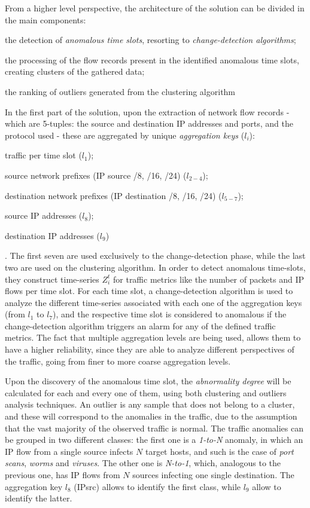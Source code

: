 \documentclass[runningheads,a4paper]{llncs}
\begin{document}
From a higher level perspective, the architecture of the solution can be divided in the main components:
\begin{enumerate*}
\item the detection of \emph{anomalous time slots}, resorting to \emph{change-detection algorithms};
\item the processing of the flow records present in the identified anomalous time slots, creating clusters of the gathered data;
\item the ranking of outliers generated from the clustering algorithm 
\end{enumerate*}


In the first part of the solution, upon the extraction of network flow records - which are 5-tuples: the source and destination IP addresses and ports, and the protocol used - these are aggregated by unique \textit{aggregation keys} ($ l_{i}$):
\begin{enumerate*}
\item traffic per time slot ($ l_{1} $);
\item source network prefixes (IP source /8, /16, /24) ($ l_{2-4} $);
\item destination network prefixes (IP destination /8, /16, /24) ($ l_{5-7} $);
\item source IP addresses ($ l_{8} $);
\item destination IP addresses ($ l_{9} $)
\end{enumerate*}. The first seven are used exclusively to the change-detection phase, while the last two are used on the clustering algorithm. In order to detect anomalous time-slots, they construct time-series $ Z_{i}^t $ for traffic metrics like the number of packets and IP flows per time slot. For each time slot, a change-detection algorithm is used to analyze the different time-series associated with each one of the aggregation keys (from $ l_{1} $ to $ l_{7} $), and the respective time slot is considered to anomalous if the change-detection algorithm triggers an alarm for any of the defined traffic metrics. The fact that multiple aggregation levels are being used, allows them to have a higher reliability, since they are able to analyze different perspectives of the traffic, going from finer to more coarse aggregation levels. 

Upon the discovery of the anomalous time slot, the \emph{abnormality degree}  will be calculated for each and every one of them, using both clustering and outliers analysis techniques. An outlier is any sample that does not belong to a cluster, and these will correspond to the anomalies in the traffic, due to the assumption that the vast majority of the observed traffic is normal. The traffic anomalies can be grouped in two different classes: the first one is a \textit{1-to-N} anomaly, in which an IP flow from a single source infects $N$ target hosts, and such is the case of \textit{port scans}, \textit{worms} and \textit{viruses}. The other one is \textit{N-to-1}, which, analogous to the previous one, has IP flows from $N$ sources infecting one single destination. The aggregation key $l_{8}$ (IPsrc) allows to identify the first class, while $l_{9}$ allow to identify the latter. 
\end{document}
